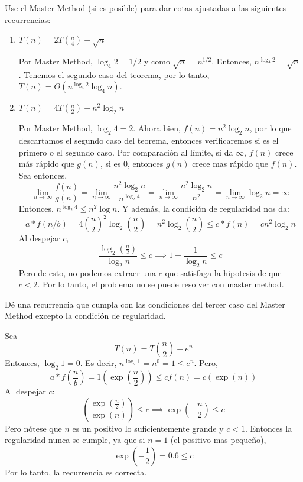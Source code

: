 \begin{problema}
\end{problema}

\begin{problema}
    Use el Master Method (si es posible) para dar cotas ajustadas a las siguientes recurrencias:
    \begin{enumerate}
        \item $T(n)=2 T\left(\frac{n}{4}\right)+\sqrt{n}$
        \begin{sol}
            Por Master Method, $\log_4 2=1/2$ y como $\sqrt{n}=n^{1/2}$. Entonces, $n^{\log_4 2}=\sqrt{n}$. Tenemos el segundo caso del teorema, por lo tanto, $T(n)= \Theta\left(n^{\log_4 2}\log_4 n\right)$.
        \end{sol}
        \item $T(n)=4 T\left(\frac{n}{2}\right)+n^2 \log _2 n$
        \begin{sol}
            Por Master Method, $\log_2 4= 2$. Ahora bien, $f(n)=n^2 \log _2 n$, por lo que descartamos el segundo caso del teorema, entonces verificaremos si es el primero o el segundo caso. Por comparación al límite, si da $\infty$, $f(n)$ crece más rápido que $g(n)$, si es 0, entonces $g(n)$ crece mas rápido que $f(n)$. Sea entonces,  
            $$\lim_{n\to \infty}\frac{f(n)}{g(n)}=\lim_{n\to \infty}\frac{n^2 \log _2 n}{n^{\log_2 4}}=\lim_{n\to \infty}\frac{n^2 \log _2 n}{n^{2}}=\lim_{n\to \infty}\log _2 n=\infty$$
            Entonces, $n^{\log_2 4}\leq n^2\log n$. Y además, la condición de regularidad nos da: 
            $$a*f(n/b)=4\left(\frac{n}{2}\right)^2\log_2\left(\frac{n}{2}\right)=n^2\log_2\left(\frac{n}{2}\right)\leq c*f(n)=cn^2\log_2 n$$
            Al despejar $c$, 
            $$\frac{\log_2\left(\frac{n}{2}\right)}{\log_2 n }\leq c\implies 1-\frac{1}{\log_2 n}\leq c$$
            Pero de esto, no podemos extraer una $c$ que satisfaga la hipotesis de que $c<2$. Por lo tanto, el problema no se puede resolver con master method. 
        \end{sol}
    \end{enumerate}
    
\end{problema}

\begin{problema}
    Dé una recurrencia que cumpla con las condiciones del tercer caso del Master Method excepto la condición de regularidad.
    \begin{sol}
        Sea 
        $$T(n) = T\left(\frac{n}{2}\right) + e^n$$
        Entonces, $\log_2 1 = 0 $. Es decir, $n^{\log_2 1 }=n^0=1\leq e^n$. Pero, 
        $$a*f\left(\frac{n}{b}\right)=1\left(\exp\left(\frac{n}{2}\right)\right)\leq cf(n)=c \left(\exp\left(n\right)\right)$$ 
        Al despejar $c$:
        $$\left(\frac{\exp\left(\frac{n}{2}\right)}{\exp\left(n\right)}\right)\leq c\implies \exp\left(-\frac{n}{2}\right)\leq c $$
        Pero nótese que $n$ es un positivo lo suficientemente grande y $c<1$. Entonces la regularidad nunca se cumple, ya que si $n=1$ (el positivo mas pequeño), 
        $$\exp\left(-\frac{1}{2}\right)=0.6\leq c$$
        Por lo tanto, la recurrencia es correcta. 
    \end{sol}
\end{problema}

